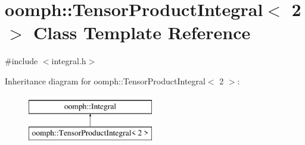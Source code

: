 \hypertarget{classoomph_1_1TensorProductIntegral_3_012_01_4}{}\section{oomph\+:\+:Tensor\+Product\+Integral$<$ 2 $>$ Class Template Reference}
\label{classoomph_1_1TensorProductIntegral_3_012_01_4}


{\ttfamily \#include $<$integral.\+h$>$}

Inheritance diagram for oomph\+:\+:Tensor\+Product\+Integral$<$ 2 $>$\+:\begin{figure}[H]
\begin{center}
\leavevmode
\includegraphics[height=2.000000cm]{classoomph_1_1TensorProductIntegral_3_012_01_4}
\end{center}
\end{figure}
